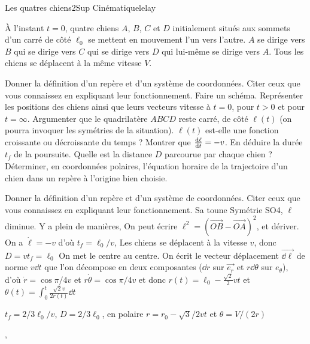 \begin{exercise}{Les quatres chiens}{2}{Sup}
{Cinématique}{lelay}

À l'instant $t = 0$, quatre chiens $A$, $B$, $C$ et $D$ initialement situés aux sommets d'un carré de côté $\ell_0$ se mettent en mouvement l'un vers l'autre. $A$ se dirige vers $B$ qui se dirige vers $C$ qui se dirige vers $D$ qui lui-même se dirige vers $A$. Tous les chiens se déplacent à la même vitesse $V$.
\begin{questions}
    \questioncours Donner la définition d'un repère et d'un système de coordonnées. Citer ceux que vous connaissez en expliquant leur fonctionnement.
    \question Faire un schéma. Représenter les positions des chiens ainsi que leurs vecteurs vitesse à $t = 0$, pour $t > 0$ et pour $t = \infty$.
    \question Argumenter que le quadrilatère $ABCD$ reste carré, de côté $\ell(t)$ (on pourra invoquer les symétries de la situation). $\ell(t)$ est-elle une fonction croissante ou décroissante du temps ?
    \question Montrer que $\dv{\ell}{t} = - v$. 
    \question En déduire la durée $t_f$ de la poursuite.
    \question Quelle est la distance $D$ parcourue par chaque chien ?
    \question Déterminer, en coordonnées polaires, l'équation horaire de la trajectoire d'un chien dans un repère à l'origine bien choisie.
\end{questions}

\end{exercise}

\begin{solution}
\begin{questions}
    \questioncours Donner la définition d'un repère et d'un système de coordonnées. Citer ceux que vous connaissez en expliquant leur fonctionnement.
    \question Sa toune
    \question Symétrie SO4, $\ell$ diminue.
    \question Y a plein de manières, On peut écrire $\ell^2 = (\vec{OB} - \vec{OA})^2$, et dériver. 
    \question On a $\dot \ell = - v$ d'où $t_f = \ell_0 / v$, 
    \question Les chiens se déplacent à la vitesse $v$, donc $D = v t_f = \ell_0$
    \question On met le centre au centre. On écrit le vecteur déplacement $\vec{\dd{\ell}}$ de norme $v \dd{t}$ que l'on décompose en deux composantes ($\dd{r}$ sur $\vec{e_r}$ et $r\dd{\theta}$ sur $e_\theta$), d'où $\dot r = \cos \pi/4 v$ et $r\dot\theta = \cos \pi/4 v$ et donc $r(t) = \ell_0 - \frac{\sqrt{2}}{2} vt$ et $\theta(t) =  \int_0^t \frac{\sqrt{2}v}{2r(t)}\dd{t}$
\end{questions}



$t_f = 2/3 \ell_0 / v$, $D = 2 / 3 \ell_0$, en polaire $r = r_0 - \sqrt{3}/2 v t$ et $\theta = V/(2r)$
\end{solution}
,